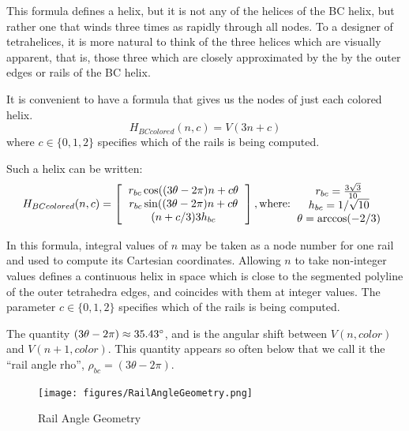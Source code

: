 \documentclass[11pt]{article}
\begin{document}
This formula defines a helix, but it is not any of the helices of the BC helix, but rather one that winds three times
as rapidly through all nodes. To a designer of tetrahelices, it is more natural to think of the three helices which
are visually apparent, that is, those three which are closely approximated by the by the outer edges or rails of the BC helix.

It is convenient to have a formula that gives us the nodes of just
each colored helix.
\[
H_{BCcolored}(n,c) = V(3n +c)
\]
where $c \in \{0,1,2\}$ specifies which of the rails is being computed.

Such a helix can be written:
\[
H_{BCcolored}(n,c) =
\left [
  \begin{tabular}{c}
   $ r_{bc}  \cos((3 \theta - 2 \pi)n + c  \theta $\\
   $ r_{bc} \sin((3 \theta - 2 \pi)n + c  \theta $\\
   $ (n + c/3) 3  h_{bc} $
  \end{tabular}
  \right ],
\text{where:}
  \begin{tabular}{c}
 $ r_{bc} = \frac{3\sqrt{3}}{10} $\\
 $ h_{bc} = 1/\sqrt{10} $ \\
 $ \theta = \arccos(-2/3) $ \\
  \end{tabular}      
  \]

In this formula, integral values of $n$ may be taken as a node number for one rail and used to compute its Cartesian
coordinates. Allowing $n$ to take non-integer values defines a continuous
helix in space which is close to the segmented polyline of the outer tetrahedra edges, and coincides with them at integer
values.
The parameter $c \in \{0,1,2\}$ specifies which of the rails is being computed.

The quantity $ (3 \theta - 2 \pi) \approx 35.43 \degree $, and is the angular shift between $V(n,color)$ and
$V(n+1,color)$. This quantity appears so often below that we call it the ``rail angle rho'', $\rho_{bc} = (3 \theta - 2 \pi)$.

\begin{figure}[H]
  \label{railanglefig}
     \centering
     \texttt{[image: figures/RailAngleGeometry.png]}
     \caption{Rail Angle Geometry}
 \end{figure}
\end{document}
